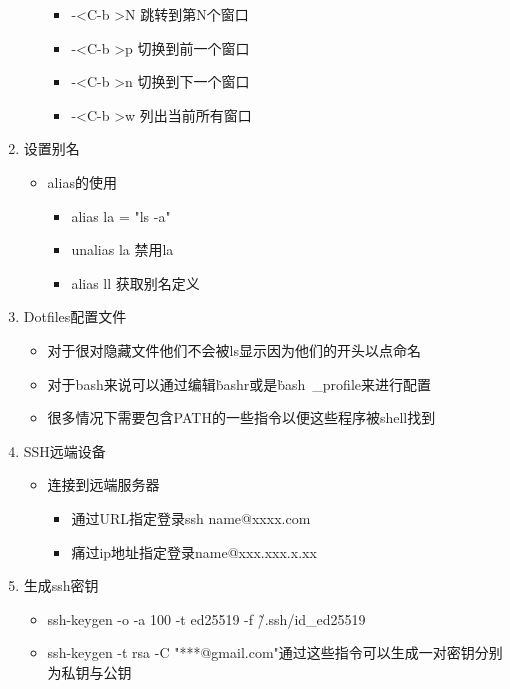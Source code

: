 \documentclass[a4paper, 12pt]{article}
\begin{document}
\begin{enumerate}
\begin{itemize}
\begin{itemize}
            \item -\textless C-b \textgreater N 跳转到第N个窗口
            \item -\textless C-b \textgreater p 切换到前一个窗口
            \item -\textless C-b \textgreater n 切换到下一个窗口
            \item -\textless C-b \textgreater w 列出当前所有窗口
        \end{itemize}
    \end{itemize}
  \item{\large 设置别名}
    \begin{itemize}
      \item alias的使用
      \begin{itemize}  
            \item alias la = "ls -a"
            \item unalias la 禁用la
            \item alias ll 获取别名定义
      \end{itemize}
    \end{itemize}
  \item{\large Dotfiles配置文件}
    \begin{itemize}
      \item 对于很对隐藏文件他们不会被ls显示因为他们的开头以点命名
      \item 对于bash来说可以通过编辑\.bashr或是\.bash\
      \_profile来进行配置
      \item 很多情况下需要包含PATH的一些指令以便这些程序被shell找到
    \end{itemize}
  \item{\large SSH远端设备}
    \begin{itemize}
      \item 连接到远端服务器
      \begin{itemize}
            \item 通过URL指定登录ssh name@xxxx.com 
            \item 痛过ip地址指定登录name@xxx.xxx.x.xx
      \end{itemize}
    \end{itemize}
  \item{\large 生成ssh密钥}
    \begin{itemize}
      \item ssh-keygen -o -a 100 -t ed25519 -f \~/.ssh/id\_ed25519
      \item ssh-keygen -t rsa -C "***@gmail.com"通过这些指令可以生成一对密钥分别为私钥与公钥

\end{itemize}
\end{enumerate}
\end{document}
